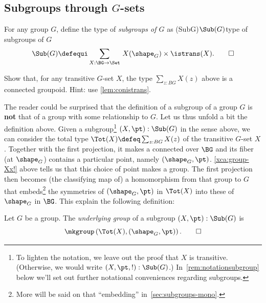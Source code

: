 \subsection{Subgroups through $G$-sets}


\begin{definition}\label{def:set-of-subgroups}
  For any group $G$, define the type of \emph{subgroups of $G$} as%
  \glossary(SubG){$\protect\Sub(G)$}{type of subgroups of $G$}
  \[
    \Sub(G)\defequi\sum_{X:\BG\to\Set}{\,}X(\sh_G)
    \times\istrans(X). \qedhere
  \]
\end{definition}

\begin{xca}\label{xca:group-Xx!}
Show that, for any transitive $G$-set $X$, the type $\sum_{z:BG}X(z)$ above is a connected groupoid.
Hint: use \cref{lem:conistrans}.
\end{xca}

The reader could be surprised that the definition of a subgroup of a group $G$
is \textbf{not} that of a group with some relationship to $G$. Let us thus unfold a
bit the definition above. Given a subgroup\footnote{%
    To lighten the notation, we leave out the proof that $X$ is transitive.
    (Otherwise, we would write $(X,\pt,!):\Sub(G)$.)
    In~\cref{rem:notationsubgroup} below we'll set out further notational
    conveniences regarding subgroups.} $(X,\pt):\Sub(G)$ in the sense above,
we can consider the total type $\Tot(X) \defeq \sum_{z:BG}X(z)$ of the
transitive $G$-set $X$. Together with the first projection, it makes a connected
\covering over $\BG$ and its fiber (at $\sh_G$) contains a particular point,
namely $(\sh_G,\pt)$. \cref{xca:group-Xx!} above tells us that this choice of
point makes a group. The first projection then becomes (the classifying map of)
a homomorphism from that group to $G$ that embeds\footnote{More will be said on
  that ``embedding'' in~\cref{sec:subgroups-mono}.} the symmetries of
$(\sh_G,\pt)$ in $\Tot(X)$ into these of $\sh_G$ in $\BG$. This explain the
following definition:

\begin{definition}\label{def:underlying-group-of-subgroup}
  Let $G$ be a group. The \emph{underlying group} %
  of a subgroup
  $(X,\pt) : \Sub(G)$ is
  \[
    \mkgroup \left(\Tot(X),(\sh_G,\pt)\right).\qedhere
  \]
\end{definition}

